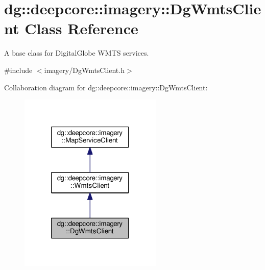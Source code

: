 \hypertarget{classdg_1_1deepcore_1_1imagery_1_1_dg_wmts_client}{}\section{dg\+:\+:deepcore\+:\+:imagery\+:\+:Dg\+Wmts\+Client Class Reference}
\label{classdg_1_1deepcore_1_1imagery_1_1_dg_wmts_client}


A base class for Digital\+Globe W\+M\+TS services.  




{\ttfamily \#include $<$imagery/\+Dg\+Wmts\+Client.\+h$>$}



Collaboration diagram for dg\+:\+:deepcore\+:\+:imagery\+:\+:Dg\+Wmts\+Client\+:
\nopagebreak
\begin{figure}[H]
\begin{center}
\leavevmode
\includegraphics[width=193pt]{classdg_1_1deepcore_1_1imagery_1_1_dg_wmts_client__coll__graph}
\end{center}
\end{figure}
